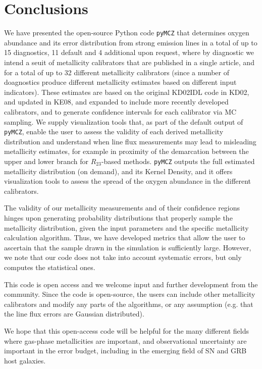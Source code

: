 \documentclass{emulateapj} \usepackage{amsmath} \usepackage{float}
\begin{document}
\section{Conclusions}\label{conclusions_sec}
We have presented the open-source Python code \verb=pyMCZ= that
determines oxygen abundance and its error distribution from strong
emission lines in a total of up to 15 diagnostics, 11 default and 4
additional upon request, where by diagnostic we intend a seuit of
metallicity calibrators that are published in a single article, and
for a total of up to 32 different metallicity calibrators (since a
number of doagnostics produce different metallicity estimates based on
different input indicators). These estimates are based on the original
KD02IDL code in KD02, and updated in KE08, and expanded to include
more recently developed calibrators, and to generate confidence
intervals for each calibrator via MC sampling. We supply visualization
tools that, as part of the default output of \verb=pyMCZ=, enable the
user to assess the validity of each derived metallicity distribution
and understand when line flux measurements may lead to misleading
metallicity estimates, for example in proximity of the demarcation
between the upper and lower branch for $R_{23}$-based
methods. \verb=pyMCZ= outputs the full estimated metallicity
distribution (on demand), and its Kernel Density, and it offers
visualization tools to assess the spread of the oxygen abundance in
the different calibrators.

The validity of our metallicity measurements and of their confidence
regions hinges upon generating probability distributions that properly
sample the metallicity distribution, given the input parameters and
the specific metallicity calculation algorithm. Thus, we have
developed metrics that allow the user to ascertain that the sample
drawn in the simulation is sufficiently large. However, we note that
our code does not take into account systematic errors, but only
computes the statistical ones.

This code is open access and we welcome input and further development
from the community.  Since the code is open-source, the users can
include other metallicity calibrators and modify any parts of the
algorithms, or any assumption (e.g. that the line flux errors are
Gaussian distributed).

We hope that this open-access code will be helpful for the many
different fields where gas-phase metallicities are important, and
observational uncertainty are important in the error budget, including
in the emerging field of SN and GRB host galaxies.
\end{document}
